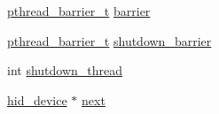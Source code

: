 \begin{DoxyCompactItemize}
\item 
\hyperlink{osx_2hid_8c_a0af030d8520cb3271d895b21a5ecca34}{pthread\-\_\-barrier\-\_\-t} \hyperlink{structhid__device___a17ee95bea7f4171afed271574f0aed3a}{barrier}
\item 
\hyperlink{osx_2hid_8c_a0af030d8520cb3271d895b21a5ecca34}{pthread\-\_\-barrier\-\_\-t} \hyperlink{structhid__device___a6bf05b2c9efebc36a20e74991c19a1e5}{shutdown\-\_\-barrier}
\item 
int \hyperlink{structhid__device___a9123c3ac997c6d08270af5fca60f7903}{shutdown\-\_\-thread}
\item 
\hyperlink{linux_2hidapi_8h_aa6da74d5686d198dd3e5440e60088fcc}{hid\-\_\-device} $\ast$ \hyperlink{structhid__device___a2e68d82cc2b4fbe02586f9861da03015}{next}
\end{DoxyCompactItemize}


